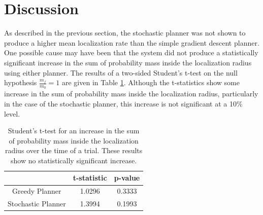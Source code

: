 \documentclass[submit, 12pt]{aiaa-pretty-modified}
\begin{document}
\section{Discussion}
\label{sec:discussion}
As described in the previous section, the stochastic planner was not
shown to produce a higher mean localization
rate than the simple gradient descent planner.  One possible cause may
have been
that the system did not produce a statistically significant increase
in the sum of probability mass inside the localization radius using
either planner.  The results of a two-sided Student's t-test on the
null hypothesis $\frac{m_f}{m_0} = 1$ are given in Table
\ref{tab:nofind}.  Although the t-statistics show some increase in the
sum of probability mass inside the localization radius,
particularly in the case of the stochastic planner, this increase is
not significant at a 10\% level.

\begin{table}[htb]
\begin{center}
\begin{tabular}{|c||c|c|}
\hline
& t-statistic & p-value \\
\hline \hline
Greedy Planner & 1.0296 & 0.3333\\
\hline
Stochastic Planner& 1.3994 &0.1993\\
\hline
\end{tabular}
\caption[Student's t-test on probability mass increase inside
localization radius.]{Student's t-test for an increase in the sum of probability
  mass inside the localization radius over the time of a trial.
  These results show no statistically significant increase.}
\label{tab:nofind}
\end{center}
\end{table}
\end{document}
